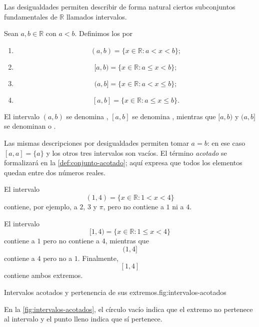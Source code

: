 Las desigualdades permiten describir de forma natural ciertos subconjuntos fundamentales de $\mathbb{R}$ llamados intervalos.

\begin{samepage}
\begin{definition}
\label{def:intervalos-acotados}
Sean $a,b\in\mathbb{R}$ con $a<b$. Definimos los  por
\begin{enumerate}
    \item
    \[
    (a,b)=\{x\in\mathbb{R}:a<x<b\};
    \]

    \item
    \[
    [a,b)=\{x\in\mathbb{R}:a\leq x<b\};
    \]

    \item
    \[
    (a,b]=\{x\in\mathbb{R}:a<x\leq b\};
    \]

    \item
    \[
    [a,b]=\{x\in\mathbb{R}:a\leq x\leq b\}.
    \]
\end{enumerate}
El intervalo $(a,b)$ se denomina , $[a,b]$ se denomina , mientras que $[a,b)$ y $(a,b]$ se denominan  o .
\end{definition}
\end{samepage}

Las mismas descripciones por desigualdades permiten tomar $a=b$: en ese caso $[a,a]=\{a\}$ y los otros tres intervalos son vacíos. El término \emph{acotado} se formalizará en la \cref{def:conjunto-acotado}; aquí expresa que todos los elementos quedan entre dos números reales.

\begin{example}
El intervalo
\[
(1,4)=\{x\in\mathbb{R}:1<x<4\}
\]
contiene, por ejemplo, a $2$, $3$ y $\pi$, pero no contiene a $1$ ni a $4$.
\end{example}

\begin{example}
El intervalo
\[
[1,4)=\{x\in\mathbb{R}:1\leq x<4\}
\]
contiene a $1$ pero no contiene a $4$, mientras que
\[
(1,4]
\]
contiene a $4$ pero no a $1$. Finalmente,
\[
[1,4]
\]
contiene ambos extremos.
\end{example}

\begin{figuranotas}{Intervalos acotados y pertenencia de sus extremos.}{fig:intervalos-acotados}

\end{figuranotas}
En la \cref{fig:intervalos-acotados}, el círculo vacío indica que el extremo no pertenece al intervalo y el punto lleno indica que sí pertenece.

